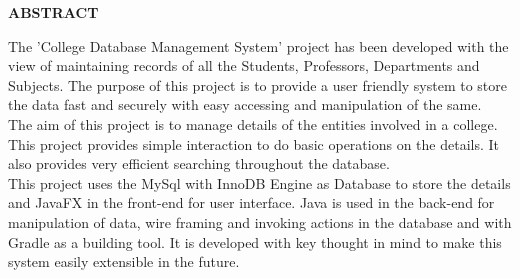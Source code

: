 \pagestyle{empty}
\begin{center}
\textup{\large{\textbf{ABSTRACT}}}
\end{center}
\justify
\indent
The 'College Database Management System' project has been developed with the view of maintaining records of all the Students, Professors, Departments and Subjects. The purpose of this project is to provide a user friendly system to store the data fast and securely with easy accessing and manipulation of the same.\\

The aim of this project is to manage details of the entities involved in a college. This project provides simple interaction to do basic operations on the details. It also provides very efficient searching throughout the database.\\

This project uses the MySql with InnoDB Engine as Database to store the details and JavaFX in the front-end for user interface. Java is used in the back-end for manipulation of data, wire framing and invoking actions in the database and with Gradle as a building tool. It is developed with key thought in mind to make this system easily extensible in the future.
\pagebreak
